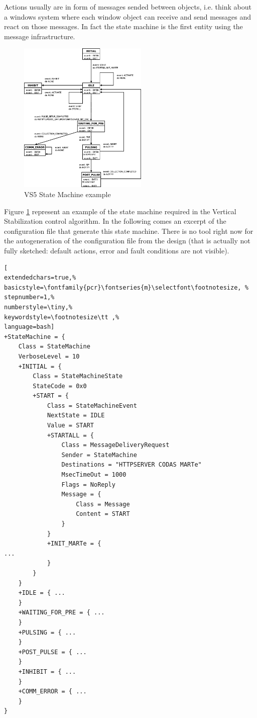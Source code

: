 Actions usually are in form of messages sended between objects, i.e. think about a windows system where each window object can receive and send messages and react on those messages. In fact the state machine is the first entity using the message infrastructure.

\begin{figure}[h!]
 \begin{center}
  \includegraphics[width=0.55\textwidth]{level5/VS5statemachine.eps}
  \caption{VS5 State Machine example}
  \label{f:level5:VS5SM_example}
 \end{center}
\end{figure}

Figure \ref{f:level5:VS5SM_example} represent an example of the state machine required in the Vertical Stabilization control algorithm. In the following comes an excerpt of the configuration file that generate this state machine. There is no tool right now for the autogeneration of the configuration file from the design (that is actually not fully sketched: default actions, error and fault conditions are not visible).

\begin{lstlisting}[
extendedchars=true,%
basicstyle=\fontfamily{pcr}\fontseries{m}\selectfont\footnotesize, %
stepnumber=1,%
numberstyle=\tiny,%
keywordstyle=\footnotesize\tt ,%
language=bash]
+StateMachine = {
    Class = StateMachine
    VerboseLevel = 10
    +INITIAL = {
        Class = StateMachineState
        StateCode = 0x0
        +START = {
            Class = StateMachineEvent
            NextState = IDLE
            Value = START
            +STARTALL = {
                Class = MessageDeliveryRequest
                Sender = StateMachine
                Destinations = "HTTPSERVER CODAS MARTe"
                MsecTimeOut = 1000
                Flags = NoReply
                Message = {
                    Class = Message
                    Content = START
                }
            }
            +INIT_MARTe = {
...
            }
        }
    }
    +IDLE = { ...
    }
    +WAITING_FOR_PRE = { ...
    }
    +PULSING = { ...
    }
    +POST_PULSE = { ...
    }
    +INHIBIT = { ...
    }
    +COMM_ERROR = { ...
    }
}
\end{lstlisting}

